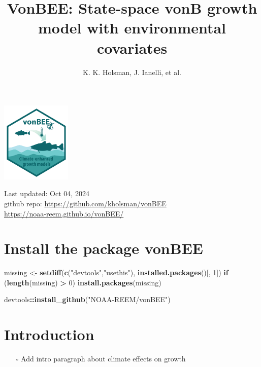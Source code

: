 \documentclass[
]{article}
\title{VonBEE: State-space vonB growth model with environmental
covariates}
\author{K. K. Holsman, J. Ianelli, et al.}
\date{}
\newenvironment{Shaded}{\begin{snugshade}}{\end{snugshade}}
\newcommand{\ControlFlowTok}[1]{\textcolor[rgb]{0.13,0.29,0.53}{\textbf{#1}}}
\newcommand{\DecValTok}[1]{\textcolor[rgb]{0.00,0.00,0.81}{#1}}
\newcommand{\FunctionTok}[1]{\textcolor[rgb]{0.13,0.29,0.53}{\textbf{#1}}}
\newcommand{\NormalTok}[1]{#1}
\newcommand{\OtherTok}[1]{\textcolor[rgb]{0.56,0.35,0.01}{#1}}
\newcommand{\SpecialCharTok}[1]{\textcolor[rgb]{0.81,0.36,0.00}{\textbf{#1}}}
\newcommand{\StringTok}[1]{\textcolor[rgb]{0.31,0.60,0.02}{#1}}
\providecommand{\tightlist}{%
  \setlength{\itemsep}{0pt}\setlength{\parskip}{0pt}}
\begin{document}
\maketitle

{
\setcounter{tocdepth}{2}
\tableofcontents
}
\includegraphics[width=0.25\textwidth,height=\textheight]{Figs/vonBEE.png}

Last updated: Oct 04, 2024\\
github repo: \url{https://github.com/kholsman/vonBEE}\\
\url{https://noaa-reem.github.io/vonBEE/}

\section{Install the package vonBEE}\label{install-the-package-vonbee}

\begin{Shaded}
\begin{Highlighting}[]
\NormalTok{  missing }\OtherTok{\textless{}{-}} \FunctionTok{setdiff}\NormalTok{(}\FunctionTok{c}\NormalTok{(}\StringTok{"devtools"}\NormalTok{,}\StringTok{"usethis"}\NormalTok{),   }\FunctionTok{installed.packages}\NormalTok{()[, }\DecValTok{1}\NormalTok{])}
  \ControlFlowTok{if}\NormalTok{ (}\FunctionTok{length}\NormalTok{(missing) }\SpecialCharTok{\textgreater{}} \DecValTok{0}\NormalTok{)  }\FunctionTok{install.packages}\NormalTok{(missing)}

\NormalTok{  devtools}\SpecialCharTok{::}\FunctionTok{install\_github}\NormalTok{(}\StringTok{"NOAA{-}REEM/vonBEE"}\NormalTok{)}
\end{Highlighting}
\end{Shaded}

\section{Introduction}\label{introduction}

\begin{itemize}
\tightlist
\item[$\square$]
  Add intro paragraph about climate effects on growth
\end{itemize}
\end{document}
